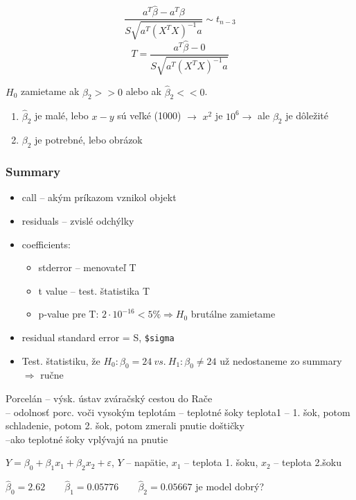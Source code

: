 \documentclass[unknownkeysallowed]{article}
\begin{document}
$$\frac{a^T\hat{\beta} - a^T\beta}{S\sqrt{a^T(X^TX)^{-1}a}} \sim t_{n-3}$$
$$T = \frac{a^T\hat{\beta} - 0}{S\sqrt{a^T(X^TX)^{-1}a}}$$

$H_0$ zamietame ak $\hat{\beta}_2 >> 0$ alebo ak $\hat{\beta}_2 << 0$.

\begin{enumerate}
\item $\hat{\beta}_2$ je malé, lebo $x-y$ sú veľké (1000) $\to$ $x^2$ je $10^6 \to$ ale $\beta_2$ je dôležité
\item $\beta_2$ je potrebné, lebo obrázok 
\end{enumerate}

\subsubsection*{Summary}
\begin{itemize}
\item call -- akým príkazom vznikol objekt
\item residuals -- zvislé odchýlky
\item coefficients:
	\begin{itemize}
	\item stderror -- menovateľ T
	\item t value -- test. štatistika T
	\item p-value pre T: $2\cdot 10^{-16} < 5\% \Rightarrow H_0$ brutálne zamietame
	\end{itemize}
\item residual standard error = S, \texttt{\$sigma}
\item Test. štatistiku, že $H_0: \beta_0 = 24 ~vs.~ H_1: \beta_0 \neq 24$ už nedostaneme zo summary $\Rightarrow$ ručne
\end{itemize}

Porcelán -- výsk. ústav zváračský cestou do Rače\\
-- odolnosť porc. voči vysokým teplotám -- teplotné šoky \qquad teplota1 -- 1. šok, potom schladenie, potom 2. šok, potom zmerali pnutie doštičky\\
--ako teplotné šoky vplývajú na pnutie

$Y = \beta_0 + \beta_1x_1 + \beta_2x_2 + \varepsilon$, $Y$ -- napätie, $x_1$ -- teplota 1. šoku, $x_2$ -- teplota 2.šoku

$\hat{\beta}_0 = 2.62 \qquad \hat{\beta}_1 = 0.05776 \qquad \hat{\beta}_2 = 0.05667$ je model dobrý?
\end{document}
